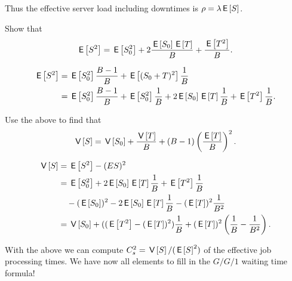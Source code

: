Thus the effective server load including downtimes is $\rho = \lambda \E{S}$. 

\begin{exercise}
  Show that
  \begin{equation*}
    \E{S^2} = \E{S_0^2} + 2\frac{\E{S_0}\E{T}} B + \frac{\E{T^2}}B.
  \end{equation*}
  \begin{solution}
  \begin{equation*}
    \begin{split}
    \E{S^2} 
&= \E{S_0^2}\frac{B-1}B + \E{(S_0+T)^2}\frac 1B \\
&= \E{S_0^2}\frac{B-1}B + \E{S_0^2} \frac 1 B + 2 \E{S_0} \E T\frac 1B + \E{T^2}\frac 1B.
    \end{split}
  \end{equation*}
  \end{solution}
\end{exercise}

\begin{exercise}
  Use the above to find that
  \begin{equation*}
    \V{S} = \V{S_0} + \frac{\V{T}} B + (B-1)\left(\frac{\E T}{B}\right)^2.
  \end{equation*}
  \begin{solution}
    \begin{equation*}
      \begin{split}
\V{S} 
&=\E{S^2} - (E{S})^2 \\
&= \E{S_0^2} + 2 \E{S_0} \E T\frac 1B + \E{T^2}\frac 1B  \\
&\quad - (\E{S_0})^2 - 2\E{S_0}\E T \frac 1 B - (\E T)^2\frac1{B^2}\\
&=  \V{S_0} + ((\E{T^2} - (\E T)^2)\frac 1 B + (\E T)^2\left(\frac 1B - \frac 1{B^2}\right).
      \end{split}
    \end{equation*}
  \end{solution}
\end{exercise}

With the above we can compute $C_s^2=\V{S}/(\E{S}^2)$ of the effective job processing times. We have now all elements to fill in the $G/G/1$ waiting time formula!

